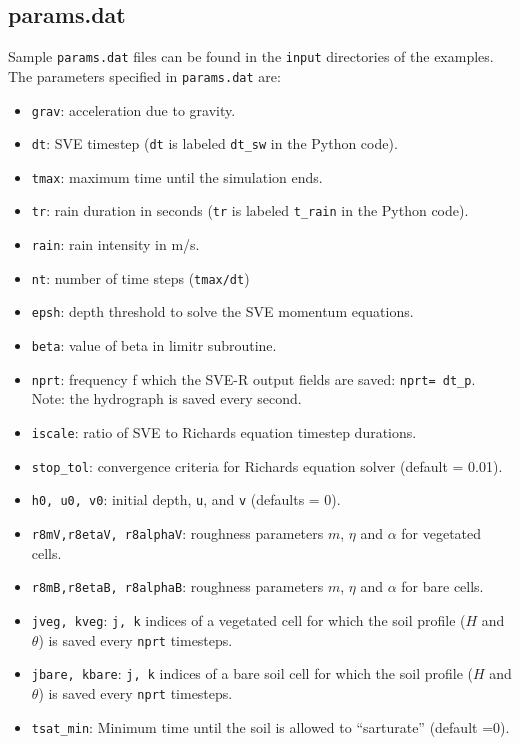 \documentclass{article}
\newcommand{\code}[1]{\texttt{#1}}
\begin{document}
\subsection{params.dat}

Sample \code{params.dat} files can be found in the \code{input} directories of the examples.  The parameters specified in \code{params.dat} are:
  
\begin{itemize}
	\item \code{grav}: acceleration due to gravity.
	\item \code{dt}: SVE timestep (\code{dt} is labeled \code{dt\_sw} in the Python code). 
	\item \code{tmax}: maximum time until the simulation ends.
	\item \code{tr}: rain duration in seconds (\code{tr} is labeled \code{t\_rain} in the Python code). 
	\item \code{rain}: rain intensity in m/s.
	\item \code{nt}:  number of time steps  (\code{tmax/dt})
	\item \code{epsh}: depth threshold to solve the SVE momentum equations.
	\item \code{beta}: value of beta in limitr subroutine.
	\item \code{nprt}: frequency f which the SVE-R output fields are saved: \code{nprt= dt\_p}.  Note: the hydrograph is saved every second.
	\item \code{iscale}: ratio of SVE to Richards equation timestep durations.
	\item \code{stop\_tol}: convergence criteria for Richards equation solver (default = 0.01).
	\item \code{h0, u0, v0}: initial depth, \code{u}, and \code{v} (defaults = 0).
	\item \code{r8mV,r8etaV, r8alphaV}: roughness parameters $m$, $\eta$ and $\alpha$ for vegetated cells. 
	\item \code{r8mB,r8etaB, r8alphaB}: roughness parameters $m$, $\eta$ and $\alpha$ for bare cells. 
	\item \code{jveg, kveg}: \code{j, k} indices of a vegetated cell for which the soil profile ($H$ and $\theta$) is saved every \code{nprt} timesteps.
	\item \code{jbare, kbare}: \code{j, k} indices of a bare soil cell for which the soil profile ($H$ and $\theta$) is saved every \code{nprt} timesteps.
	\item \code{tsat\_min}: Minimum time until the soil is allowed to ``sarturate'' (default =0).
\end{itemize}
\end{document}
